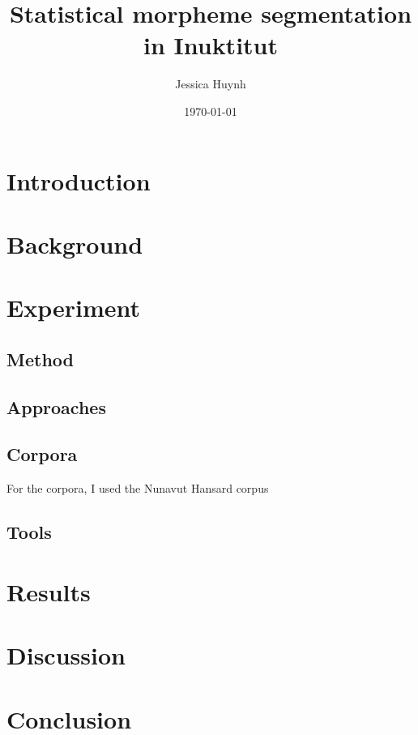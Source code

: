 \documentclass[10pt]{article}
\title{Statistical morpheme segmentation in Inuktitut}
\author{Jessica Huynh}
\date{\today}
\begin{document}
	
\maketitle

\onehalfspacing

\section{Introduction}

\section{Background}

\section{Experiment}
\cite{analyzer}

\subsection{Method}
\cite{morfessor}

\subsection{Approaches}

\subsection{Corpora}
For the corpora, I used the Nunavut Hansard corpus\cite{hansard}

\subsection{Tools}

\section{Results}

\section{Discussion}

\section{Conclusion}

\pagebreak


\end{document}
